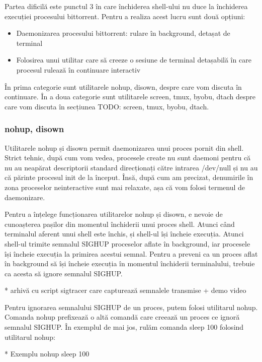 Partea dificilă este punctul 3 în care închiderea shell-ului nu duce la
închiderea execuției procesului bittorrent. Pentru a realiza acest lucru sunt
două opțiuni:

\begin{itemize}
	\item Daemonizarea procesului bittorrent: rulare în background, detașat de terminal
	\item Folosirea unui utilitar care să creeze o sesiune de terminal detașabilă în care procesul rulează în continuare interactiv
\end{itemize}

În prima categorie sunt utilitarele nohup, disown, despre care vom discuta în
continuare. În a doua categorie sunt utilitarele screen, tmux, byobu, dtach
despre care vom discuta în secțiunea TODO: screen, tmux, byobu, dtach.

\subsubsection{nohup, disown}

Utilitarele nohup și disown permit daemonizarea unui proces pornit din shell.
Strict tehnic, după cum vom vedea, procesele create nu sunt daemoni pentru că nu
au neapărat descriptorii standard direcționați către intrarea /dev/null și nu au
că părinte procesul init de la început. Însă, după cum am precizat, denumirile
în zona proceselor neinteractive sunt mai relaxate, așa că vom folosi termenul
de daemonizare.

Pentru a înțelege funcționarea utilitarelor nohup și disown, e nevoie de
cunoașterea pașilor din momentul închiderii unui proces shell. Atunci când
terminalul aferent unui shell este închis, și shell-ul își încheie execuția.
Atunci shell-ul trimite semnalul SIGHUP proceselor aflate în background, iar
procesele își încheie execuția la primirea acestui semnal. Pentru a preveni ca
un proces aflat în background să își încheie execuția în momentul închiderii
terminalului, trebuie ca acesta să ignore semnalul SIGHUP.

* arhivă cu script sigtracer care capturează semnalele transmise + demo video

Pentru ignorarea semnalului SIGHUP de un proces, putem folosi utilitarul nohup.
Comanda nohup prefixează o altă comandă care creează un proces ce ignoră
semnalul SIGHUP. În exemplul de mai jos, rulăm comanda sleep 100 folosind
utilitarul nohup:

* Exemplu nohup sleep 100

